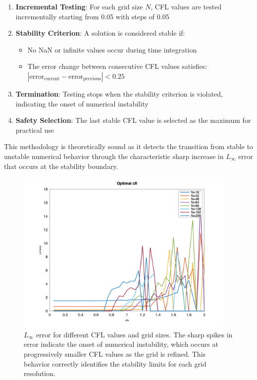 \begin{enumerate}
	\item \textbf{Incremental Testing}: For each grid size $N$, CFL values are tested incrementally starting from 0.05 with steps of 0.05
	\item \textbf{Stability Criterion}: A solution is considered stable if:
	      \begin{itemize}
		      \item No NaN or infinite values occur during time integration
		      \item The error change between consecutive CFL values satisfies: $|\text{error}_{\text{current}} - \text{error}_{\text{previous}}| < 0.25$
	      \end{itemize}
	\item \textbf{Termination}: Testing stops when the stability criterion is violated, indicating the onset of numerical instability
	\item \textbf{Safety Selection}: The last stable CFL value is selected as the maximum for practical use
\end{enumerate}

This methodology is theoretically sound as it detects the transition from stable to unstable numerical behavior through the characteristic sharp increase in $L_\infty$ error that occurs at the stability boundary.

\begin{figure}[H]
	\begin{center}
		\includegraphics[width=0.95\textwidth]{media/cfl_errors.png}
	\end{center}
	\caption{$L_{\infty}$ error for different CFL values and grid sizes. The sharp spikes in error indicate the onset of numerical instability, which occurs at progressively smaller CFL values as the grid is refined. This behavior correctly identifies the stability limits for each grid resolution.}\label{fig:error_fc}
\end{figure}

